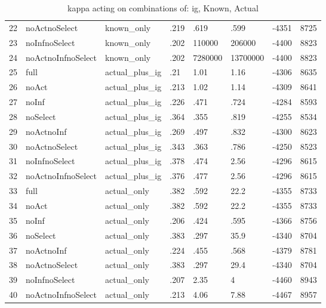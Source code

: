 \begin{table}[ht]
\begin{tabular}{rlllllll}
  22 & noActnoSelect & known\_only & .219 & .619 & .599 & -4351 & 8725 \\ 
  23 & noInfnoSelect & known\_only & .202 & 110000 & 206000 & -4400 & 8823 \\ 
  24 & noActnoInfnoSelect & known\_only & .202 & 7280000 & 13700000 & -4400 & 8823 \\ 
  25 & full & actual\_plus\_ig & .21 & 1.01 & 1.16 & -4306 & 8635 \\ 
  26 & noAct & actual\_plus\_ig & .213 & 1.02 & 1.14 & -4309 & 8641 \\ 
  27 & noInf & actual\_plus\_ig & .226 & .471 & .724 & -4284 & 8593 \\ 
  28 & noSelect & actual\_plus\_ig & .364 & .355 & .819 & -4255 & 8534 \\ 
  29 & noActnoInf & actual\_plus\_ig & .269 & .497 & .832 & -4300 & 8623 \\ 
  30 & noActnoSelect & actual\_plus\_ig & .343 & .363 & .786 & -4250 & 8523 \\ 
  31 & noInfnoSelect & actual\_plus\_ig & .378 & .474 & 2.56 & -4296 & 8615 \\ 
  32 & noActnoInfnoSelect & actual\_plus\_ig & .376 & .477 & 2.56 & -4296 & 8615 \\ 
  33 & full & actual\_only & .382 & .592 & 22.2 & -4355 & 8733 \\ 
  34 & noAct & actual\_only & .382 & .592 & 22.2 & -4355 & 8733 \\ 
  35 & noInf & actual\_only & .206 & .424 & .595 & -4366 & 8756 \\ 
  36 & noSelect & actual\_only & .383 & .297 & 35.9 & -4340 & 8704 \\ 
  37 & noActnoInf & actual\_only & .224 & .455 & .568 & -4379 & 8781 \\ 
  38 & noActnoSelect & actual\_only & .383 & .297 & 29.4 & -4340 & 8704 \\ 
  39 & noInfnoSelect & actual\_only & .207 & 2.35 & 4 & -4460 & 8943 \\ 
  40 & noActnoInfnoSelect & actual\_only & .213 & 4.06 & 7.88 & -4467 & 8957 \\ 
   \hline
\end{tabular}
\caption{kappa acting on combinations of: ig, Known, Actual} 
\end{table}
